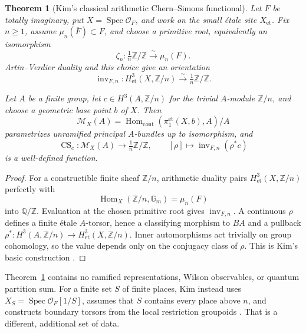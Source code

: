 \documentclass[11pt]{article}
\theoremstyle{plain}
\newtheorem{theorem}{Theorem}[section]
\theoremstyle{definition}
\theoremstyle{remark}
\begin{document}
\begin{theorem}[Kim's classical arithmetic Chern--Simons functional]
\label{thm:kim}
Let \(F\) be totally imaginary, put
\(X=\operatorname{Spec}\mathcal O_F\), and work on the small \'etale site
\(X_{\mathrm{et}}\).  Fix \(n\geq1\), assume
\(\mu_n(\overline F)\subset F\), and choose a primitive root, equivalently
an isomorphism
\[
 \zeta_n:\tfrac1n\mathbb Z/\mathbb Z\xrightarrow{\sim}\mu_n(F).
\]
Artin--Verdier duality and this choice give an orientation
\[
 \operatorname{inv}_{F,n}:
 H^3_{\mathrm{et}}(X,\mathbb Z/n)
 \xrightarrow{\sim}\tfrac1n\mathbb Z/\mathbb Z.
\]

Let \(A\) be a finite group, let
\(c\in H^3(A,\mathbb Z/n)\) for the trivial \(A\)-module
\(\mathbb Z/n\), and choose a geometric base point \(b\) of \(X\).  Then
\[
 \mathcal M_X(A)=
 \operatorname{Hom}_{\mathrm{cont}}(\pi_1^{\mathrm{et}}(X,b),A)/A
\]
parametrizes unramified principal \(A\)-bundles up to isomorphism, and
\[
 \operatorname{CS}_c:\mathcal M_X(A)
 \longrightarrow\tfrac1n\mathbb Z/\mathbb Z,
 \qquad
 [\rho]\longmapsto
 \operatorname{inv}_{F,n}(\rho^*c)
\]
is a well-defined function.
\end{theorem}

\begin{proof}
For a constructible finite sheaf \(\mathbb Z/n\), arithmetic duality pairs
\(H^3_{\mathrm{et}}(X,\mathbb Z/n)\) perfectly with
\[
 \operatorname{Hom}_X(\mathbb Z/n,\mathbb G_m)=\mu_n(F)
\]
into \(\mathbb Q/\mathbb Z\).  Evaluation at the chosen primitive root
gives \(\operatorname{inv}_{F,n}\).  A continuous \(\rho\) defines a
finite \'etale \(A\)-torsor, hence a classifying morphism to \(BA\) and a
pullback
\(\rho^*:H^3(A,\mathbb Z/n)\to H^3_{\mathrm{et}}(X,\mathbb Z/n)\).
Inner automorphisms act trivially on group cohomology, so the value depends
only on the conjugacy class of \(\rho\).  This is Kim's basic construction
\cite[\S1]{Kim2016}.
\end{proof}

Theorem~\ref{thm:kim} contains no ramified representations, Wilson
observables, or quantum partition sum.  For a finite set \(S\) of finite
places, Kim instead uses
\(X_S=\operatorname{Spec}\mathcal O_F[1/S]\), assumes that \(S\) contains
every place above \(n\), and constructs boundary torsors from the local
restriction groupoids \cite[\S2]{Kim2016}.  That is a different, additional
set of data.
\end{document}
